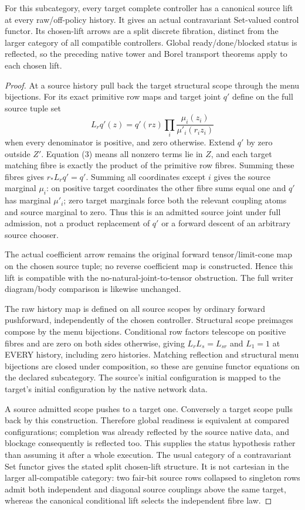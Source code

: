 \documentclass[11pt]{article}
\begin{document}
\begin{theorem}
For this subcategory, every target complete controller has a canonical source
lift at every raw/off-policy history. It gives an actual contravariant
Set-valued control functor. Its chosen-lift arrows are a split discrete
fibration, distinct from the larger category of all compatible controllers.
Global ready/done/blocked status is reflected, so the preceding native tower
and Borel transport theorems apply to each chosen lift.
\end{theorem}
\begin{proof}
At a source history pull back the target structural scope through the menu
bijections. For its exact primitive row maps and target joint $q'$ define
on the full source tuple set
\[
 L_rq'(z)=q'(rz)\prod_i\frac{\mu_i(z_i)}{\mu'_i(r_i z_i)}
\]
when every denominator is positive, and zero otherwise. Extend $q'$ by zero
outside $Z'$. Equation (3) means all nonzero terms lie in $Z$, and each target
matching fibre is exactly the product of the primitive row fibres.
Summing these fibres gives $r_*L_rq'=q'$. Summing all coordinates except
$i$ gives the source marginal $\mu_i$: on positive target coordinates the
other fibre sums equal one and $q'$ has marginal $\mu'_i$; zero target
marginals force both the relevant coupling atoms and source marginal to zero.
Thus this is an admitted source joint under full admission, not a product
replacement of $q'$ or a forward descent of an arbitrary source chooser.

The actual coefficient arrow remains the original forward tensor/limit-cone
map on the chosen source tuple; no reverse coefficient map is constructed.
Hence this lift is compatible with the no-natural-joint-to-tensor obstruction.
The full writer diagram/body comparison is likewise unchanged.

The raw history map is defined on all source scopes by ordinary forward
pushforward, independently of the chosen controller. Structural scope
preimages compose by the menu bijections. Conditional row factors telescope
on positive fibres and are zero on both sides otherwise, giving
$L_rL_s=L_{sr}$ and $L_1=1$ at EVERY history, including zero histories.
Matching reflection and structural menu bijections are closed under
composition, so these are genuine functor equations on the declared
subcategory. The source's initial configuration is mapped to the target's
initial configuration by the native network data.

A source admitted scope pushes to a target one. Conversely a target scope
pulls back by this construction. Therefore global readiness is equivalent
at compared configurations; completion was already reflected by the source
native data, and blockage consequently is reflected too. This supplies the
status hypothesis rather than assuming it after a whole execution.
The usual category of a contravariant Set functor gives the stated split
chosen-lift structure. It is not cartesian in the larger all-compatible
category: two fair-bit source rows collapsed to singleton rows admit both
independent and diagonal source couplings above the same target, whereas
the canonical conditional lift selects the independent fibre law.
\end{proof}
\end{document}
